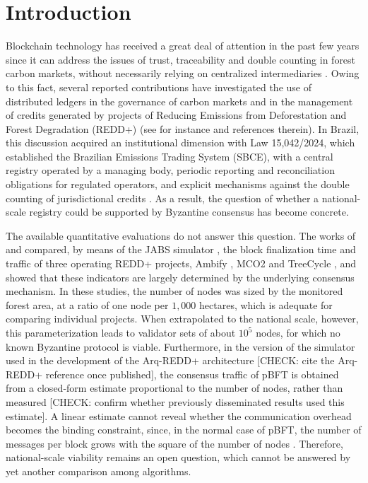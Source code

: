 \documentclass[english]{sbc2025}%
\newcommand{\chk}[1]{\textcolor{orange!80!black}{[CHECK: #1]}}
\begin{document}
\section{Introduction}
\label{sec:intro}

Blockchain technology has received a great deal of attention in the past few years since it can address the issues of trust, traceability and double counting in forest carbon markets, without necessarily relying on centralized intermediaries \citep{Howson2019ncc,Kotsialou2022}. Owing to this fact, several reported contributions have investigated the use of distributed ledgers in the governance of carbon markets and in the management of credits generated by projects of Reducing Emissions from Deforestation and Forest Degradation (REDD+) (see for instance \citep{Howson2019geoforum,Kotsialou2021,Marke2022,Vilkov2023,He2022} and references therein). In Brazil, this discussion acquired an institutional dimension with Law 15,042/2024, which established the Brazilian Emissions Trading System (SBCE), with a central registry operated by a managing body, periodic reporting and reconciliation obligations for regulated operators, and explicit mechanisms against the double counting of jurisdictional credits \citep{Lei15042}. As a result, the question of whether a national-scale registry could be supported by Byzantine consensus has become concrete.

The available quantitative evaluations do not answer this question. The works of \citet{Caburlao2025reic} and \citet{Caburlao2026clei} compared, by means of the JABS simulator \citep{Yajam2023}, the block finalization time and traffic of three operating REDD+ projects, Ambify \citep{Ambipar2021}, MCO2 \citep{Moss2020} and TreeCycle \citep{GlobalTree2019}, and showed that these indicators are largely determined by the underlying consensus mechanism. In these studies, the number of nodes was sized by the monitored forest area, at a ratio of one node per $1{,}000$ hectares, which is adequate for comparing individual projects. When extrapolated to the national scale, however, this parameterization leads to validator sets of about $10^{5}$ nodes, for which no known Byzantine protocol is viable. Furthermore, in the version of the simulator used in the development of the Arq-REDD+ architecture \chk{cite the Arq-REDD+ reference once published}, the consensus traffic of pBFT is obtained from a closed-form estimate proportional to the number of nodes, rather than measured \chk{confirm whether previously disseminated results used this estimate}. A linear estimate cannot reveal whether the communication overhead becomes the binding constraint, since, in the normal case of pBFT, the number of messages per block grows with the square of the number of nodes \citep{Castro1999}. Therefore, national-scale viability remains an open question, which cannot be answered by yet another comparison among algorithms.
\end{document}
